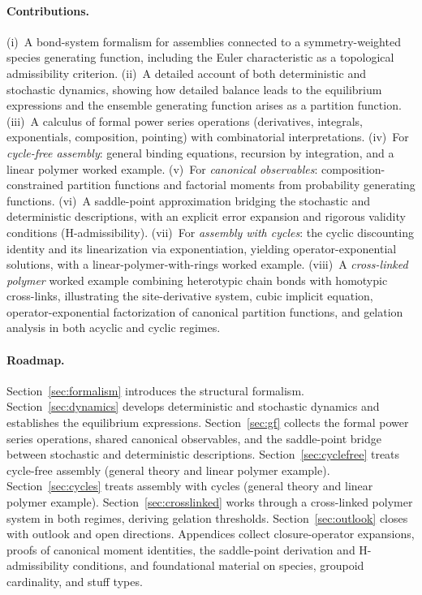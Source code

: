 \documentclass[11pt]{amsart}
\theoremstyle{definition}
\theoremstyle{plain}
\theoremstyle{remark}
\begin{document}
\paragraph{Contributions.}
(i)~A bond-system formalism for assemblies connected to a symmetry-weighted species generating function, including the Euler characteristic as a topological admissibility criterion.
(ii)~A detailed account of both deterministic and stochastic dynamics, showing how detailed balance leads to the equilibrium expressions and the ensemble generating function arises as a partition function.
(iii)~A calculus of formal power series operations (derivatives, integrals, exponentials, composition, pointing) with combinatorial interpretations.
(iv)~For \emph{cycle-free assembly}: general binding equations, recursion by integration, and a linear polymer worked example.
(v)~For \emph{canonical observables}: composition-constrained partition functions and factorial moments from probability generating functions.
(vi)~A saddle-point approximation bridging the stochastic and deterministic descriptions, with an explicit error expansion and rigorous validity conditions (H-admissibility).
(vii)~For \emph{assembly with cycles}: the cyclic discounting identity and its linearization via exponentiation, yielding operator-exponential solutions, with a linear-polymer-with-rings worked example.
(viii)~A \emph{cross-linked polymer} worked example combining heterotypic chain bonds with homotypic cross-links, illustrating the site-derivative system, cubic implicit equation, operator-exponential factorization of canonical partition functions, and gelation analysis in both acyclic and cyclic regimes.

\paragraph{Roadmap.}
Section~\ref{sec:formalism} introduces the structural formalism.
Section~\ref{sec:dynamics} develops deterministic and stochastic dynamics and establishes the equilibrium expressions.
Section~\ref{sec:gf} collects the formal power series operations, shared canonical observables, and the saddle-point bridge between stochastic and deterministic descriptions.
Section~\ref{sec:cyclefree} treats cycle-free assembly (general theory and linear polymer example).
Section~\ref{sec:cycles} treats assembly with cycles (general theory and linear polymer example).
Section~\ref{sec:crosslinked} works through a cross-linked polymer system in both regimes, deriving gelation thresholds.
Section~\ref{sec:outlook} closes with outlook and open directions.
Appendices collect closure-operator expansions, proofs of canonical moment identities, the saddle-point derivation and H-admissibility conditions, and foundational material on species, groupoid cardinality, and stuff types.
\end{document}
